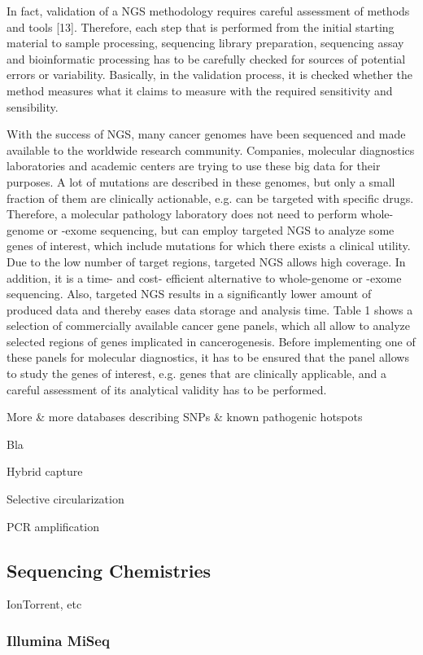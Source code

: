 In fact, validation of a NGS methodology requires careful assessment of methods
and tools [13]. Therefore, each step that is performed from the initial starting
material to sample processing, sequencing library preparation, sequencing assay
and bioinformatic processing has to be carefully checked for sources of
potential errors or variability. Basically, in the validation process, it is
checked whether the method measures what it claims to measure with the required
sensitivity and sensibility.

With the success of NGS, many cancer genomes have been sequenced and made
available to the worldwide research community. Companies, molecular diagnostics
laboratories and academic centers are trying to use these big data for their
purposes. A lot of mutations are described in these genomes, but only a small
fraction of them are clinically actionable, e.g. can be targeted with specific
drugs. Therefore, a molecular pathology laboratory does not need to perform
whole-genome or -exome sequencing, but can employ targeted NGS to analyze some
genes of interest, which include mutations for which there exists a clinical
utility. Due to the low number of target regions, targeted NGS allows high
coverage. In addition, it is a time- and cost- efficient alternative to
whole-genome or -exome sequencing. Also, targeted NGS results in a significantly
lower amount of produced data and thereby eases data storage and analysis time.
Table 1 shows a selection of commercially available cancer gene panels, which
all allow to analyze selected regions of genes implicated in cancerogenesis.
Before implementing one of these panels for molecular diagnostics, it has to be
ensured that the panel allows to study the genes of interest, e.g. genes that
are clinically applicable, and a careful assessment of its analytical validity
has to be performed.

More \& more databases describing SNPs \& known pathogenic hotspots

Bla {\cite{enrichment_methods:2011}}

Hybrid capture

Selective circularization

PCR amplification

\subsection{Sequencing Chemistries}

IonTorrent, etc

\subsubsection{Illumina MiSeq}

